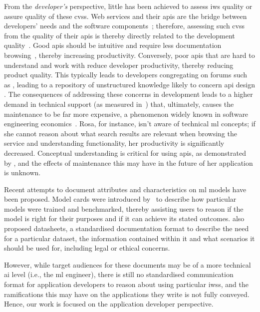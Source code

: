 From the \textit{developer's} perspective, little has been achieved to assess \gls{iws} quality or assure quality of these \glspl{cvs}. Web services and their \glspl{api} are the bridge between developers' needs and the software components~\citep{Arnold:2005vc}; therefore, assessing such \glspl{cvs} from the quality of their \glspl{api} is thereby directly related to the development quality~\citep{Ko:2004td}. Good \glspl{api} should be intuitive and require less documentation browsing~\citep{Piccioni:2013em}, thereby increasing productivity. Conversely, poor \glspl{api} that are hard to understand and work with reduce developer productivity, thereby reducing product quality. This typically leads to developers congregating on forums such as , leading to a repository of unstructured knowledge likely to concern \gls{api} design \citep{7180082}. The consequences of addressing these concerns in development leads to a higher demand in technical support (as measured in~\citep{Henning:2009hz}) that, ultimately, causes the maintenance to be far more expensive, a phenomenon widely known in software engineering economics~\citep{Boehm:1981ua}. Rosa, for instance, isn't aware of technical \gls{ml} concepts; if she cannot reason about what search results are relevant when browsing the service and understanding functionality, her productivity is significantly decreased. Conceptual understanding is critical for using \glspl{api}, as demonstrated by \citeauthor{Ko:2011fb}, and the effects of maintenance this may have in the future of her application is unknown.

Recent attempts to document attributes and characteristics on \gls{ml} models have been proposed. Model cards were introduced by~\citet{Mitchell:2018in} to describe how particular models were trained and benchmarked, thereby assisting users to reason if the model is right for their purposes and if it can achieve its stated outcomes. \citet{Gebru:2018wh} also proposed datasheets, a standardised documentation format to describe the need for a particular dataset, the information contained within it and what scenarios it should be used for, including legal or ethical concerns. 

However, while target audiences for these documents may be of a more technical \gls{ai} level (i.e., the \gls{ml} engineer), there is still no standardised communication format for application developers to reason about using particular \glspl{iws}, and the ramifications this may have on the applications they write is not fully conveyed. Hence, our work is focused on the application developer perspective. 

